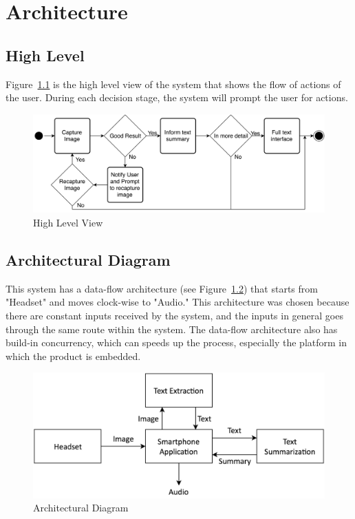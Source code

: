 \chapter{Architecture}

\section{High Level}
Figure~\ref{activityDiagram} is the high level view of the system that shows the flow of actions of the user.
During each decision stage, the system will prompt the user for actions.


\begin{figure}
	\centering
    \includegraphics[scale = 0.105]{Activity_H.png}%
    
    \caption{High Level View}
	\label{activityDiagram}
\end{figure}

\section{Architectural Diagram}
This system has a data-flow architecture (see Figure~\ref{architectualDiagram}) that starts from "Headset" and moves clock-wise to "Audio." This architecture was chosen because there are constant inputs received by the system, and the inputs in general goes through the same route within the system. The data-flow architecture also has build-in concurrency, which can speeds up the process, especially the platform in which the product is embedded.
\begin{figure}
	\centering
    \includegraphics[scale = 0.2]{ArchitectureDiagram.png}
    
    \caption{Architectural Diagram}
	\label{architectualDiagram}
\end{figure}

